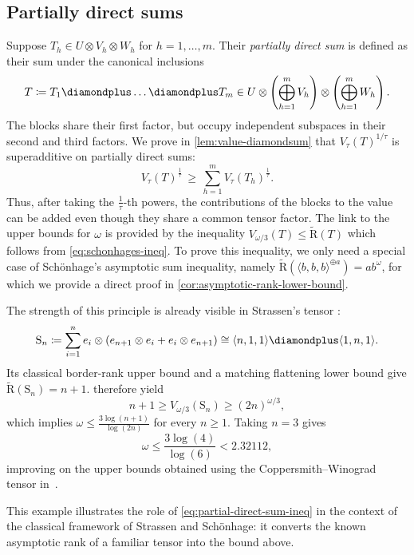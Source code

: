\documentclass[11pt,letterpaper]{article}
\numberwithin{equation}{section}
\newcommand{\ark}{\widetilde{\mathrm{R}}}
\begin{document}
\subsection{Partially direct sums}
Suppose $T_h\in U\otimes V_h\otimes W_h$ for $h=1,\dots,m$.
Their \emph{partially direct sum} is defined as their sum under the canonical inclusions \[
T \coloneqq  T_1 \diamondplus \dots \diamondplus T_{m} \in U\otimes \left(\bigoplus_{h=1}^{m}V_h\right)\otimes \left(\bigoplus_{h=1}^{m}W_h\right).
\]
The blocks share their first factor, but occupy independent subspaces in their second and third factors.
We prove in \cref{lem:value-diamondsum} that $V_\tau(T)^{1/\tau}$ is superadditive on partially direct sums:
\begin{equation}
\label{eq:partial-direct-sum-ineq}
V_\tau(T)^{\frac{1}{\tau}} \, \geq \, \sum_{h=1}^{m} V_\tau(T_h)^{\frac{1}{\tau}}.
\end{equation}
Thus, after taking the $\frac{1}{\tau}$-th powers, the contributions of the blocks to the value can be added even though they share a common tensor factor.
The link to the upper bounds for $\omega$ is provided by the inequality $V_{\omega/3}(T)\leq\ark(T)$ which follows from \cref{eq:schonhages-ineq}.
To prove this inequality, we only need a special case of Sch\"{o}nhage's asymptotic sum inequality, namely $\ark(\langle b,b,b\rangle^{\oplus a})=ab^\omega$, for which we provide a direct proof in \cref{cor:asymptotic-rank-lower-bound}.

The strength of this principle is already visible in Strassen's tensor \cite{Strassen-87}: \[
\mathrm{S}_n\coloneqq \sum_{i=1}^{n} e_i\otimes \left(e_{n+1}\otimes e_i +  e_i\otimes e_{n+1}\right) \cong \langle n,1,1\rangle \diamondplus \langle 1,n,1\rangle.
\] Its classical border-rank upper bound and a matching flattening lower bound give $
\ark(\mathrm{S}_n)=n+1$.
 therefore yield \[
n+1 \geq V_{\omega/3}(\mathrm{S}_n) \geq (2n)^{\omega/3},
\] which implies $\omega \leq \frac{3\log(n+1)}{\log(2n)}$ for every $n\geq 1$.
Taking $n=3$ gives \[
\omega \leq \frac{3\log(4)}{\log(6)}< 2.32112,
\] improving on the upper bounds obtained using the Coppersmith--Winograd tensor in~\cite{CW-90,Stothers2010,Williams-12,LeGall-14,AW-21,DWZ-23,WXXZ,GDM-26}.

This example illustrates the role of \cref{eq:partial-direct-sum-ineq} in the context of the classical framework of Strassen and Sch\"onhage: it converts the known asymptotic rank of a familiar tensor into the bound above.
\end{document}
